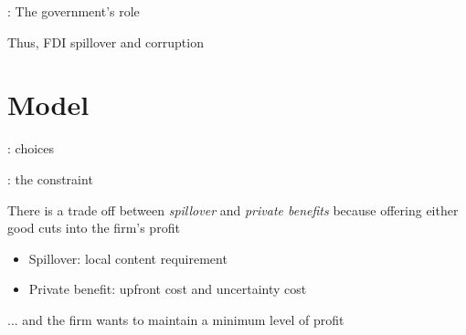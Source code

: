 \documentclass[14pt]{beamer}
\begin{document}
\begin{frame}{\secname: The government's role}



\end{frame}

\begin{frame}{\secname}
Thus, FDI spillover and corruption
\end{frame}

\section{Model}

\begin{frame}{\secname: choices}

\end{frame}

\begin{frame}{\secname: the constraint}

There is a trade off between \textit{spillover} and \textit{private benefits} because offering either good cuts into the firm's profit
\begin{itemize}
\item<2-> Spillover: local content requirement
\item<3-> Private benefit: upfront cost and uncertainty cost 
\end{itemize}

... and the firm wants to maintain a minimum level of profit

\end{frame}
\end{document}
